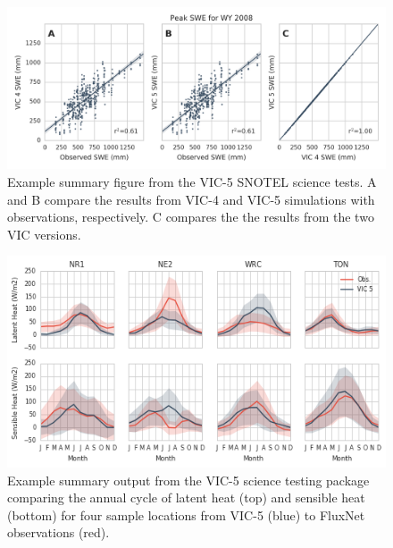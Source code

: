 \documentclass[gmd, manuscript]{copernicus}
\begin{document}
\clearpage
\begin{figure}[t]
\includegraphics[width=6in]{VIC_science_tests_SWE.png}
\caption{Example summary figure from the VIC-5 SNOTEL science tests. A and B compare the results from VIC-4 and VIC-5 simulations with observations, respectively. C compares the the results from the two VIC versions.}
\label{fig:vic_4v5}
\end{figure}

\clearpage
\begin{figure}[t]
\includegraphics[width=12cm]{VIC_science_tests_fluxes.png}
\caption{Example summary output from the VIC-5 science testing package comparing the annual cycle of latent heat (top) and sensible heat (bottom) for four sample locations from VIC-5 (blue) to FluxNet observations (red).}
\label{fig:vic_fluxes}
\end{figure}
\end{document}
